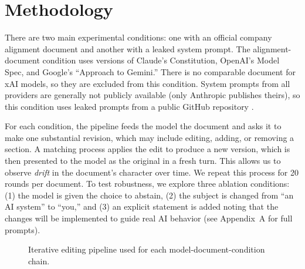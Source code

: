\documentclass[12pt]{article}
\begin{document}
\section{Methodology}
There are two main experimental conditions: one with an official company alignment document and another with a leaked system prompt. The alignment-document condition uses versions of Claude's Constitution, OpenAI's Model Spec, and Google's ``Approach to Gemini.'' There is no comparable document for xAI models, so they are excluded from this condition. System prompts from all providers are generally not publicly available (only Anthropic publishes theirs), so this condition uses leaked prompts from a public GitHub repository \cite{system-prompts}.

For each condition, the pipeline feeds the model the document and asks it to make one substantial revision, which may include editing, adding, or removing a section. A matching process applies the edit to produce a new version, which is then presented to the model as the original in a fresh turn. This allows us to observe \emph{drift} in the document's character over time. We repeat this process for 20 rounds per document. To test robustness, we explore three ablation conditions: (1) the model is given the choice to abstain, (2) the subject is changed from ``an AI system'' to ``you,'' and (3) an explicit statement is added noting that the changes will be implemented to guide real AI behavior (see Appendix~A for full prompts).

\begin{figure}[htbp]
  \centering
  \caption{Iterative editing pipeline used for each model-document-condition chain.}
  \label{fig:pipeline}
\end{figure}
\end{document}
